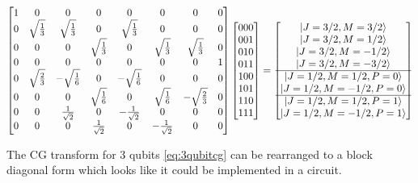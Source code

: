 \begin{align}
\begin{bmatrix}
1 &0 &0 &0 &0 &0 &0 &0 \\
0 &\sqrt{\frac{1}{3}} &\sqrt{\frac{1}{3}} &0 &\sqrt{\frac{1}{3}} &0 &0 &0\\
0 &0 &0 &\sqrt{\frac{1}{3}} &0 &\sqrt{\frac{1}{3}} &\sqrt{\frac{1}{3}} &0 \\
0 &0 &0 &0 &0 &0 &0 &1 \\
0 &\sqrt{\frac{2}{3}} &-\sqrt{\frac{1}{6}} &0 &-\sqrt{\frac{1}{6}} &0 &0 &0\\
0 &0 &0 &\sqrt{\frac{1}{6}} &0 &\sqrt{\frac{1}{6}} &-\sqrt{\frac{2}{3}} &0 \\
0 &0 &\frac{1}{\rtwo} &0 &-\frac{1}{\rtwo} &0 &0 &0 \\
0 &0 &0 &\frac{1}{\rtwo} &0 &-\frac{1}{\rtwo} &0 &0 \\
\end{bmatrix}
%
\begin{bmatrix}
000 \\
001 \\
010 \\
011 \\
100 \\
101 \\
110 \\
111 \\
\end{bmatrix}
=
\begin{bmatrix}
\ket{J=3/2, M=3/2} \\
\ket{J=3/2, M=1/2} \\
\ket{J=3/2, M=-1/2} \\
\ket{J=3/2, M=-3/2} \\ 
\hline
\ket{J=1/2, M=1/2, P=0} \\
\ket{J=1/2, M=-1/2, P=0} \\
\hline
\ket{J=1/2, M=1/2, P=1} \\
\ket{J=1/2, M=-1/2, P=1} \\ 
\end{bmatrix}
\label{eq:3qubitcg}
\end{align}

The CG transform for 3 qubits \autoref{eq:3qubitcg} can be rearranged to a block diagonal form which looks like it could be implemented in a circuit.

